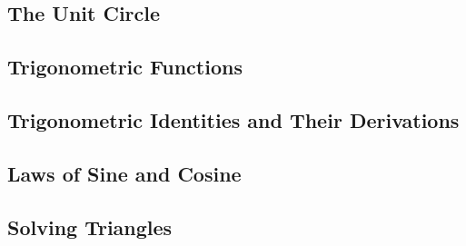 \documentclass[../Math_Notes.tex]{subfiles}
\begin{document}
\subsection{The Unit Circle}
\subsection{Trigonometric Functions}
\subsection{Trigonometric Identities and Their Derivations}
\subsection{Laws of Sine and Cosine}
\subsection{Solving Triangles}
\end{document}
